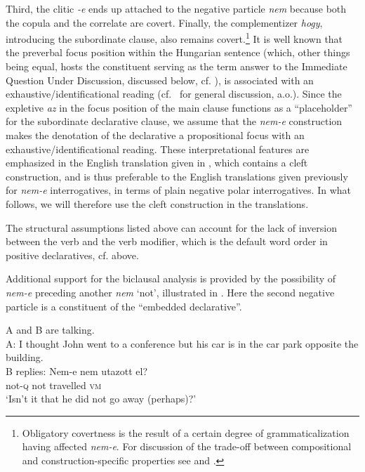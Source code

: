 \documentclass[output=paper,colorlinks,citecolor=brown]{langscibook}
\begin{document}
	Third, the clitic \textit{-e}  ends up attached to the  negative particle \textit{nem} because both the copula and the correlate  are covert. Finally, the complementizer \textit{hogy}, introducing the subordinate clause, also remains  covert.\footnote{Obligatory covertness is the result of a certain degree of grammaticalization having affected \textit{nem-e}. For discussion of the trade-off between compositional and construction-specific properties see \citet{reis1999} and \citet{jacobs2016}.}  It is well known that the preverbal focus position within the Hungarian sentence (which, other things being equal,  hosts the constituent serving as the term answer to the Immediate Question Under Discussion, discussed below, cf. \citealt{gyuris2012}), is associated with an  exhaustive/identificational reading (cf.~\citealt{ekiss2002, szabolcsi94} for general discussion, a.o.). Since the  expletive \textit{az} in the focus position of the main clause functions as a ``placeholder'' for the subordinate declarative clause, 
	we assume that the \textit{nem-e} construction makes the  denotation of the declarative a propositional focus with an exhaustive/identificational reading. These interpretational features are emphasized in the  English translation given in , which contains a cleft construction, and is thus preferable to the English translations given previously  for \textit{nem-e} interrogatives, in terms of plain negative polar interrogatives. In what follows, we will therefore use the cleft construction in the translations.
	
	

	
	The structural assumptions listed above can account for the lack of inversion between the verb and the verb modifier, which is the default word order in positive declaratives, cf.  above. 
	

	
	Additional support for the biclausal analysis is provided by the possibility of \textit{nem-e}  preceding another \textit{nem} `not', illustrated in . Here the second negative particle is a constituent of the ``embedded declarative''.
	
	\ea\label{ex:nem-e-nem} A and B are talking. \\
	A: I thought John went to a conference but his car is in the car park opposite the building.\\ 
    B replies: \gll Nem-e  nem utazott el?\\
	not-\textsc{q} not travelled \textsc{vm}\\
	\glt \phantom{B replies:} `Isn't it that he did not go away (perhaps)?'
	\z
	
\end{document}
